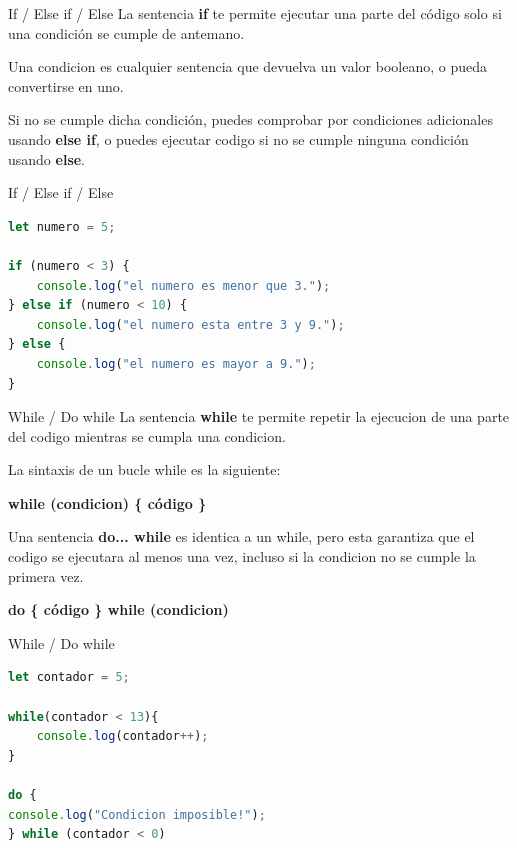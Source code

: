 \documentclass{beamer}
\begin{document}
\begin{frame}{If / Else if / Else}
La sentencia \textbf{if} te permite ejecutar una parte del código solo si una condición se cumple de antemano. 

Una condicion es cualquier sentencia que devuelva un valor booleano, o pueda convertirse en uno.

Si no se cumple dicha condición, puedes comprobar por condiciones adicionales usando \textbf{else if}, o puedes ejecutar codigo si no se cumple ninguna condición usando \textbf{else}.
\end{frame}

\begin{frame}[fragile]{If / Else if / Else}
\begin{lstlisting}[language=JavaScript]
let numero = 5;

if (numero < 3) {
    console.log("el numero es menor que 3.");
} else if (numero < 10) {
    console.log("el numero esta entre 3 y 9.");
} else {
    console.log("el numero es mayor a 9.");
}
\end{lstlisting}
\end{frame}

\begin{frame}{While / Do while}
La sentencia \textbf{while} te permite repetir la ejecucion de una parte del codigo mientras se cumpla una condicion.

La sintaxis de un bucle while es la siguiente:

\textbf{while (condicion) \{ código \} }

Una sentencia \textbf{do... while} es identica a un while, pero esta garantiza que el codigo se ejecutara al menos una vez, incluso si la condicion no se cumple la primera vez.

\textbf{do \{ código \} while (condicion) }

\end{frame}

\begin{frame}[fragile]{While / Do while}
\begin{lstlisting}[language=JavaScript]
let contador = 5;

while(contador < 13){
    console.log(contador++);
}

do {
console.log("Condicion imposible!");
} while (contador < 0)   
\end{lstlisting}
\end{frame}
\end{document}
